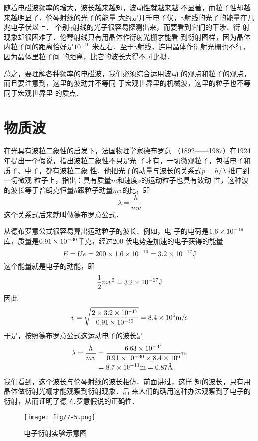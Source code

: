 随着电磁波频率的增大，波长越来越短，波动性就越来越
不显著，而粒子性却越来越明显了．伦琴射线的光子的能量
大约是几千电子伏，$\gamma$射线的光子的能量在几兆电子伏以上．
个别$\gamma$射线的光子很容易探测出来，而要看到它们的干涉、衍
射现象却很困难了．伦琴射线只有用晶体作衍射光栅才能看
到衍射图样，因为晶体内粒子间的距离恰好是$10^{-10}$
米左右．至于$\gamma$射线，连用晶体作衍射光栅也不行，因为晶体里粒子间
的距离，比它的波长大得不可比拟．

总之，要理解各种频率的电磁波，我们必须综合运用波动
的观点和粒子的观点，而且要注意到，这里的波动并不等同
于宏观世界里的机械波，这里的粒子也不等同于宏观世界里
的质点．

\section{物质波}
在光具有波粒二象性的启发下，法国物理学家德布罗意
（1892——1987）在1924年提出一个假说，指出波粒二象性不只是光
子才有，一切微观粒子，包括电子和质子、中子，都有波粒二象
性．他把光子的动量与波长的关系式$p=h/\lambda$
推广到一切微观
粒子上，指出：具有质量$m$和速度$v$的运动粒子也具有波动
性，这种波的波长等于普朗克恒量$h$跟粒子动量$mv$的比，即
\[\lambda=\frac{h}{mv} \]
这个关系式后来就叫做德布罗意公式．

从德布罗意公式很容易算出运动粒子的波长．例如，电
子的电荷是$1.6\times10^{-19}$
库，质量是$0.91\times10^{-30}$千克，经过200
伏电势差加速的电子获得的能量
\[E=Ue=200\times1.6\times10^{-19}=3.2\times10^{-17}{\rm J}\]
这个能量就是电子的动能，即
\[\dfrac{1}{2}mv^2=3.2\times10^{-17}{\rm J} \]
因此
\[v=\sqrt{\frac{2\times 3.2\times10^{-17}}{0.91\times 10^{-30}}}=8.4\times10^6\text{m}/\text{s} \]
于是，按照德布罗意公式这运动电子的波长是
\[\begin{split}
    \lambda=\dfrac{h}{mv}&=\frac{6.63\times 10^{-34}}{0.91\times10^{-30}\times8.4\times 10^6}{\rm m} \\
&=8.7\times10^{-11}{\rm m}=0.87\text{\AA}
\end{split}\]
我们看到，这个波长与伦琴射线的波长相仿．前面讲过，这样
短的波长，只有用晶体做衍射光栅才能观察到衍射现象．后
来人们的确用这种办法观察到了电子的衍射，从而证明了德
布罗意假说的正确性．
\begin{figure}[htp]\centering
    \texttt{[image: fig/7-5.png]}
    \caption{电子衍射实验示意图}
    \end{figure}

